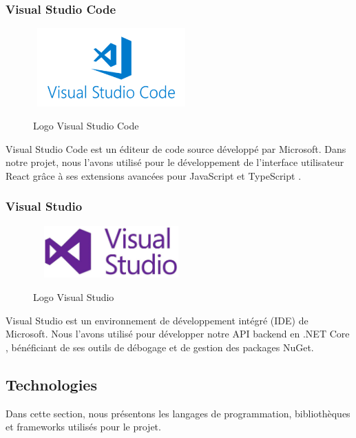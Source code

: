 \subsubsection{Visual Studio Code}

\begin{figure}[H]%
    \center%
    {
        \includegraphics[width=6cm,height=3cm]{images/vscode.png}%
    }
    \caption{Logo Visual Studio Code}%
\end{figure}

\noindent Visual Studio Code \cite{vscode} est un éditeur de code source développé par Microsoft. Dans notre projet, nous l'avons utilisé pour le développement de l'interface utilisateur React \cite{react} grâce à ses extensions avancées pour JavaScript et TypeScript \cite{typescript}.

\subsubsection{Visual Studio}

\begin{figure}[H]%
    \center%
    {
        \includegraphics[width=6cm,height=2cm]{images/visualstudio.png}%
    }
    \caption{Logo Visual Studio}%
\end{figure}

\noindent Visual Studio \cite{visualstudio} est un environnement de développement intégré (IDE) de Microsoft. Nous l'avons utilisé pour développer notre API backend en .NET Core \cite{dotnet}, bénéficiant de ses outils de débogage et de gestion des packages NuGet.

\subsection{Technologies}

\noindent Dans cette section, nous présentons les langages de programmation, bibliothèques et frameworks utilisés pour le projet.

